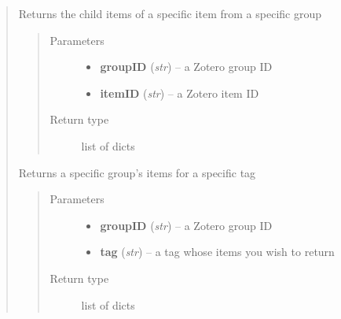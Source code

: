 \documentclass[letterpaper,10pt,english]{sphinxmanual}
\begin{document}
\begin{quote}
\begin{fulllineitems}
\end{fulllineitems}



\begin{fulllineitems}
\label{index:pyzotero.zotero.Zotero.group_item_children}
Returns the child items of a specific item from a specific group
\begin{quote}\begin{description}
\item[{Parameters}] \leavevmode\begin{itemize}
\item {} 
\textbf{groupID} (\emph{str}) -- a Zotero group ID

\item {} 
\textbf{itemID} (\emph{str}) -- a Zotero item ID

\end{itemize}

\item[{Return type}] \leavevmode
list of dicts

\end{description}\end{quote}

\end{fulllineitems}



\begin{fulllineitems}
\label{index:pyzotero.zotero.Zotero.group_items_tag}
Returns a specific group's items for a specific tag
\begin{quote}\begin{description}
\item[{Parameters}] \leavevmode\begin{itemize}
\item {} 
\textbf{groupID} (\emph{str}) -- a Zotero group ID

\item {} 
\textbf{tag} (\emph{str}) -- a tag whose items you wish to return

\end{itemize}

\item[{Return type}] \leavevmode
list of dicts


\end{description}
\end{quote}
\end{fulllineitems}
\end{quote}
\end{document}
